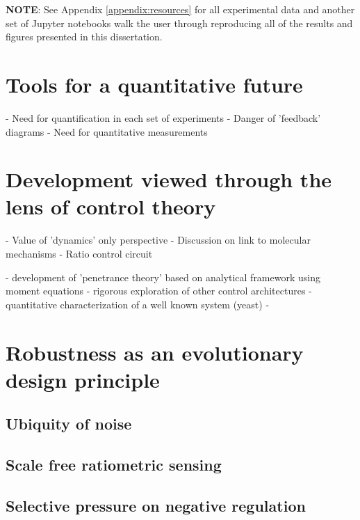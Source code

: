 \textbf{NOTE}: See Appendix \ref{appendix:resources} for all experimental data and another set of Jupyter notebooks walk the user through reproducing all of the results and figures presented in this dissertation.











\section{ Tools for a quantitative future }

- Need for quantification in each set of experiments
- Danger of 'feedback' diagrams
- Need for quantitative measurements


\section{ Development viewed through the lens of control theory }

- Value of 'dynamics' only perspective
- Discussion on link to molecular mechanisms
- Ratio control circuit





- development of 'penetrance theory' based on analytical framework using moment equations
- rigorous exploration of other control architectures
- quantitative characterization of a well known system (yeast)
-


\section{Robustness as an evolutionary design principle}

	\subsection{Ubiquity of noise}	
	
	\subsection{Scale free ratiometric sensing}
	
	\subsection{Selective pressure on negative regulation}
	
